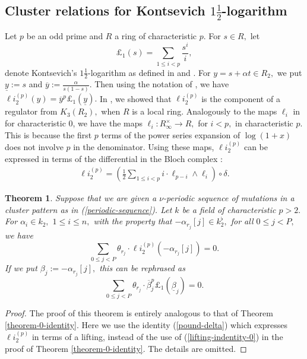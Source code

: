 \documentclass{amsart}
\newtheorem{theorem}{Theorem}[subsection]
\theoremstyle{definition}
\numberwithin{equation}{subsection}
\begin{document}
\subsection{Cluster relations for Kontsevich $1\frac{1}{2}$-logarithm } Let $p$ be an odd prime and $R$ a ring of characteristic $p.$ For $s \in R,$ let 
\[
\pounds_1(s) = \sum_{1 \leq i <p } \frac{s^i}{i},
\]
denote Kontsevich's $1\frac{1}{2}$-logarithm as defined in \cite[Definition 4.1]{gang} and \cite{kont}. For $y=s+\alpha t \in R_{2},$ we put $\underline{y}:=s$ and $\overline{y}:=\frac{\alpha}{s(1-s)}.$ Then using the notation of \cite[]{uao}, we have 
$\ell i _2^{(p)}(y)=\overline{y}^p \pounds_1(\underline{y}).$ In \cite{uao}, we showed   that $\ell i _2^{(p)}$ is the  component of  a regulator from $K_{3}(R_2),$ when $R$ is a local ring. Analogously to the maps $\ell _i$  in  for characteristic 0, we have the  maps $\ell _i: R_{\infty} ^{\times } \to R,$ for $i<p,$ in characteristic $p.$  This is because the first $p$ terms of the power series expansion of $\log(1+x)$ does not involve $p$ in the denominator. Using these maps,  $\ell i_{2}^{(p)}$ can  be expressed in terms of the differential in the Bloch complex \cite[]{chow-kont}: 
\begin{align}\label{pound-delta}
\ell i_{2} ^{(p)}=(\frac{1}{2} \sum _{1 \leq i <p }i\cdot \ell _{p-i} \wedge \ell _{i}) \circ \delta. 
\end{align}

 

\begin{theorem}\label{theorem-p} Suppose that we are given a $\nu$-periodic sequence of mutations in a cluster pattern as in (\ref{periodic-sequence}). Let $k$ be a field of characteristic $p>2.$ For $\alpha_{i} \in k_{2} ,$ $1\leq i \leq n,$ with the property that $-\alpha _{r_{j}}[j] \in k_{2}^{\flat},$ for all $0\leq j <P,$  we have 
$$
\sum_{0\leq j<P}\theta_{r_j}\cdot \ell i^{(p)} _{2}(-\alpha _{r_j}[j])=0.
$$ If we 
 put $\beta_{j}:=-\alpha_{r_j}[j],$ this can be rephrased as 
$$
\sum_{0\leq j<P}\theta_{r_j} \cdot\overline{\beta}_j^p \pounds_{1}(\underline{\beta}_j
)=0.
$$
\end{theorem}


\begin{proof}
The proof of this theorem is entirely analogous to that of Theorem \ref{theorem-0-identity}.  Here we use the identity (\ref{pound-delta}) which expresses $\ell i_{2} ^{(p)}$ in terms of a lifting,  instead of the use of (\ref{lifting-indentity-0}) in the proof of Theorem \ref{theorem-0-identity}. The details are omitted.  
\end{proof}
\end{document}
